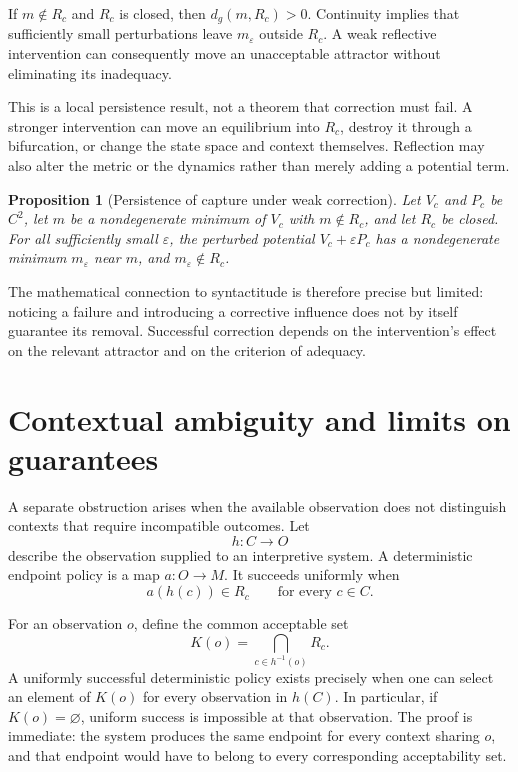 \documentclass[11pt]{article}
\newtheorem{proposition}{Proposition}
\begin{document}
If $m\notin R_c$ and $R_c$ is closed, then $d_g(m,R_c)>0$. Continuity implies that sufficiently small perturbations leave $m_\varepsilon$ outside $R_c$. A weak reflective intervention can consequently move an unacceptable attractor without eliminating its inadequacy.

This is a local persistence result, not a theorem that correction must fail. A stronger intervention can move an equilibrium into $R_c$, destroy it through a bifurcation, or change the state space and context themselves. Reflection may also alter the metric or the dynamics rather than merely adding a potential term.

\begin{proposition}[Persistence of capture under weak correction]
Let $V_c$ and $P_c$ be $C^2$, let $m$ be a nondegenerate minimum of $V_c$ with $m\notin R_c$, and let $R_c$ be closed. For all sufficiently small $\varepsilon$, the perturbed potential $V_c+\varepsilon P_c$ has a nondegenerate minimum $m_\varepsilon$ near $m$, and $m_\varepsilon\notin R_c$.
\end{proposition}

The mathematical connection to syntactitude is therefore precise but limited: noticing a failure and introducing a corrective influence does not by itself guarantee its removal. Successful correction depends on the intervention's effect on the relevant attractor and on the criterion of adequacy.

\section{Contextual ambiguity and limits on guarantees}
\label{sec:ambiguity}

A separate obstruction arises when the available observation does not distinguish contexts that require incompatible outcomes. Let
\[
h\colon C\longrightarrow O
\]
describe the observation supplied to an interpretive system. A deterministic endpoint policy is a map $a\colon O\to M$. It succeeds uniformly when
\[
a(h(c))\in R_c
\qquad
\text{for every }c\in C.
\]

For an observation $o$, define the common acceptable set
\[
K(o)
=
\bigcap_{c\in h^{-1}(o)}R_c.
\]
A uniformly successful deterministic policy exists precisely when one can select an element of $K(o)$ for every observation in $h(C)$. In particular, if $K(o)=\varnothing$, uniform success is impossible at that observation. The proof is immediate: the system produces the same endpoint for every context sharing $o$, and that endpoint would have to belong to every corresponding acceptability set.
\end{document}
